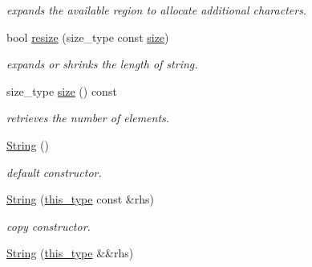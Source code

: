 \begin{DoxyCompactItemize}
\begin{DoxyCompactList}\small\item\em expands the available region to allocate additional characters. \end{DoxyCompactList}\item 
\hypertarget{classhryky_1_1_string_ae2a52a7868534d2a48fd01db2ea35c1a}{bool \hyperlink{classhryky_1_1_string_ae2a52a7868534d2a48fd01db2ea35c1a}{resize} (size\-\_\-type const \hyperlink{classhryky_1_1_string_a9db0f71dce7b2de86a54ab5323759265}{size})}\label{classhryky_1_1_string_ae2a52a7868534d2a48fd01db2ea35c1a}

\begin{DoxyCompactList}\small\item\em expands or shrinks the length of string. \end{DoxyCompactList}\item 
\hypertarget{classhryky_1_1_string_a9db0f71dce7b2de86a54ab5323759265}{size\-\_\-type \hyperlink{classhryky_1_1_string_a9db0f71dce7b2de86a54ab5323759265}{size} () const }\label{classhryky_1_1_string_a9db0f71dce7b2de86a54ab5323759265}

\begin{DoxyCompactList}\small\item\em retrieves the number of elements. \end{DoxyCompactList}\item 
\hypertarget{classhryky_1_1_string_ad60595ccc01ad3a9c1c32b9c7eb0a115}{\hyperlink{classhryky_1_1_string_ad60595ccc01ad3a9c1c32b9c7eb0a115}{String} ()}\label{classhryky_1_1_string_ad60595ccc01ad3a9c1c32b9c7eb0a115}

\begin{DoxyCompactList}\small\item\em default constructor. \end{DoxyCompactList}\item 
\hypertarget{classhryky_1_1_string_a5f2897c6c0c4c57fdb7f7d46fdc89817}{\hyperlink{classhryky_1_1_string_a5f2897c6c0c4c57fdb7f7d46fdc89817}{String} (\hyperlink{classhryky_1_1_string}{this\-\_\-type} const \&rhs)}\label{classhryky_1_1_string_a5f2897c6c0c4c57fdb7f7d46fdc89817}

\begin{DoxyCompactList}\small\item\em copy constructor. \end{DoxyCompactList}\item 
\hypertarget{classhryky_1_1_string_af752573e708f1a541385d376f4a6729e}{\hyperlink{classhryky_1_1_string_af752573e708f1a541385d376f4a6729e}{String} (\hyperlink{classhryky_1_1_string}{this\-\_\-type} \&\&rhs)}\label{classhryky_1_1_string_af752573e708f1a541385d376f4a6729e}


\end{DoxyCompactItemize}
